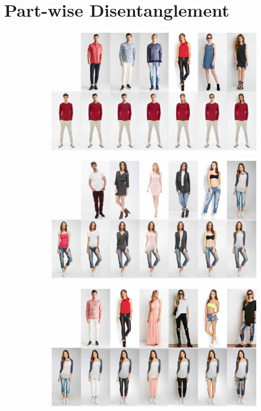 \section{Part-wise Disentanglement}\label{sec:partwise}
	\begin{figure}[htp]
		\begin{subfigure}{0.49\linewidth}
		\centering
		\includegraphics[trim={0cm 0cm 0cm 0cm},clip, width=1.\linewidth]{fig/factor/part6_01}\caption{}
		\label{fig:part3_00}
		\end{subfigure}
		\begin{subfigure}{0.49\linewidth}
		\centering
		\includegraphics[trim={0cm 0cm 0cm 0cm},clip, width=1.\linewidth]{fig/factor/part6_10}\caption{}
		\label{fig:part3_11}
		\end{subfigure}
		\begin{subfigure}{0.49\linewidth}
		\centering
		\includegraphics[trim={0cm 0cm 0cm 0cm},clip, width=1.\linewidth]{fig/factor/part6_21}\caption{}

\end{subfigure}
\end{figure}
